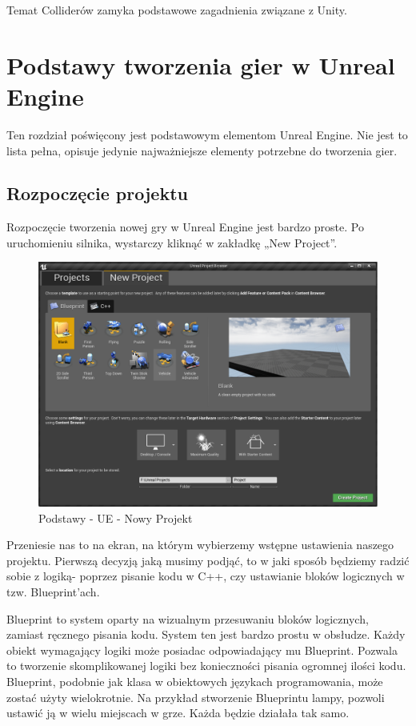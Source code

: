 \documentclass[12pt]{xmgr}
\begin{document}
Temat Colliderów zamyka podstawowe zagadnienia związane z Unity.

\chapter{Podstawy tworzenia gier w Unreal Engine}

Ten rozdział poświęcony jest podstawowym elementom Unreal Engine. Nie jest to lista pełna, opisuje jedynie najważniejsze elementy potrzebne do tworzenia gier.

\section{Rozpoczęcie projektu}

Rozpoczęcie tworzenia nowej gry w Unreal Engine jest bardzo proste. Po uruchomieniu silnika, wystarczy kliknąć w zakładkę „New Project”.

\begin{figure}[!htb]
    \begin{center}
    \includegraphics[scale=0.35]{Screeny/New_project}
    \end{center}
    \caption{Podstawy - UE - Nowy Projekt}
\end{figure}

Przeniesie nas to na ekran, na którym wybierzemy wstępne ustawienia naszego projektu. Pierwszą decyzją jaką musimy podjąć, to w jaki sposób będziemy radzić sobie z logiką- poprzez pisanie kodu w C++, czy ustawianie bloków logicznych w tzw. Blueprint’ach.

Blueprint to system oparty na wizualnym przesuwaniu bloków logicznych, zamiast ręcznego pisania kodu. System ten jest bardzo prostu w obsłudze. Każdy obiekt wymagający logiki może posiadac odpowiadający mu Blueprint. Pozwala to tworzenie skomplikowanej logiki bez konieczności pisania ogromnej ilości kodu. Blueprint, podobnie jak klasa w obiektowych językach programowania, może zostać użyty wielokrotnie. Na przykład stworzenie Blueprintu lampy, pozwoli ustawić ją w wielu miejscach w grze. Każda będzie działała tak samo.
\end{document}
